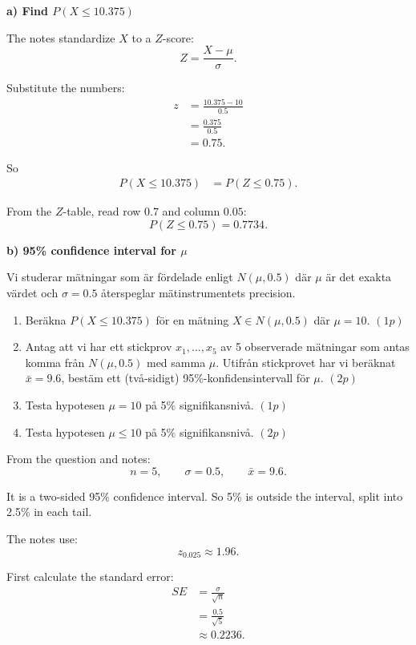\documentclass[10pt]{article}
\begin{document}
\textbf{a) Find \(P(X \le 10.375)\)}

The notes standardize \(X\) to a \(Z\)-score:
\[
Z=\frac{X-\mu}{\sigma}.
\]

Substitute the numbers:
\begin{align*}
z
&=
\frac{10.375-10}{0.5}
\\[2mm]
&=
\frac{0.375}{0.5}
\\[2mm]
&=0.75.
\end{align*}

So
\begin{align*}
P(X \le 10.375)
&=
P(Z \le 0.75).
\end{align*}

From the \(Z\)-table, read row \(0.7\) and
column \(0.05\):
\[
P(Z \le 0.75)=0.7734.
\]

\textbf{b) 95\% confidence interval for \(\mu\)}

Vi studerar mätningar som är fördelade enligt
\(N(\mu,0.5)\) där \(\mu\) är det exakta värdet
och \(\sigma = 0.5\) återspeglar mätinstrumentets
precision.

\begin{enumerate}[label=\alph*)]
\item Beräkna \(P(X \le 10.375)\) för en mätning
\(X \in N(\mu,0.5)\) där \(\mu = 10\). \((1p)\)

\item Antag att vi har ett stickprov
\(x_1,\ldots,x_5\) av 5 observerade mätningar som
antas komma från \(N(\mu,0.5)\) med samma \(\mu\).
Utifrån stickprovet har vi beräknat \(\bar{x}=9.6\),
bestäm ett (två-sidigt) 95\%-konfidensintervall
för \(\mu\). \((2p)\)

\item Testa hypotesen \(\mu = 10\) på
5\% signifikansnivå. \((1p)\)

\item Testa hypotesen \(\mu \le 10\) på
5\% signifikansnivå. \((2p)\)
\end{enumerate}

From the question and notes:
\[
n=5,\qquad \sigma=0.5,\qquad \bar{x}=9.6.
\]

It is a two-sided 95\% confidence interval.
So 5\% is outside the interval, split into
2.5\% in each tail.

The notes use:
\[
z_{0.025}\approx 1.96.
\]

First calculate the standard error:
\begin{align*}
SE
&=
\frac{\sigma}{\sqrt{n}}
\\[2mm]
&=
\frac{0.5}{\sqrt{5}}
\\[2mm]
&\approx 0.2236.
\end{align*}
\end{document}
